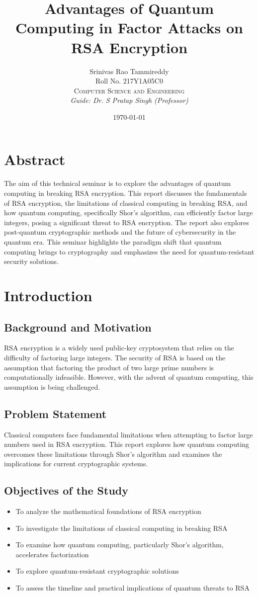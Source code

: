 \documentclass{article}
\title{Advantages of Quantum Computing in Factor Attacks on RSA Encryption}
\author{Srinivas Rao Tammireddy \\
Roll No. 217Y1A05C0 \\
\textsc{Computer Science and Engineering} \\
\textit{Guide: Dr. S Pratap Singh (Professor)}
}
\date{\today}  %
\begin{document}
\maketitle
\newpage
\tableofcontents
\newpage
\listoffigures
\listoftables
\newpage

\section{Abstract}
The aim of this technical seminar is to explore the advantages of quantum computing in breaking RSA encryption. This report discusses the fundamentals of RSA encryption, the limitations of classical computing in breaking RSA, and how quantum computing, specifically Shor's algorithm, can efficiently factor large integers, posing a significant threat to RSA encryption. The report also explores post-quantum cryptographic methods and the future of cybersecurity in the quantum era. This seminar highlights the paradigm shift that quantum computing brings to cryptography and emphasizes the need for quantum-resistant security solutions.

\section{Introduction}
\subsection{Background and Motivation}
RSA encryption is a widely used public-key cryptosystem that relies on the difficulty of factoring large integers. The security of RSA is based on the assumption that factoring the product of two large prime numbers is computationally infeasible. However, with the advent of quantum computing, this assumption is being challenged.

\subsection{Problem Statement}
Classical computers face fundamental limitations when attempting to factor large numbers used in RSA encryption. This report explores how quantum computing overcomes these limitations through Shor's algorithm and examines the implications for current cryptographic systems.

\subsection{Objectives of the Study}
\begin{itemize}
    \item To analyze the mathematical foundations of RSA encryption
    \item To investigate the limitations of classical computing in breaking RSA
    \item To examine how quantum computing, particularly Shor's algorithm, accelerates factorization
    \item To explore quantum-resistant cryptographic solutions
    \item To assess the timeline and practical implications of quantum threats to RSA
\end{itemize}
\end{document}

